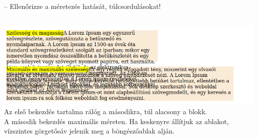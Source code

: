 \begin{frame}
  \begin{exampleblock}{ -- Ellenőrizze a méretezés hatását, túlcsordulásokat!}
    \scriptsize
    
    
  \end{exampleblock}
  \begin{columns}[T]
      \includegraphics[width=\textwidth]{tulnyulas.png}
      Az első bekezdés tartalma rálóg a másodikra, túl alacsony a blokk.\\
      A második bekezdés maximális méreten. Ha keskenyre állítjuk az ablakot, vízszintes görgetősáv jelenik meg a böngészőablak alján.
  \end{columns}
\end{frame}
